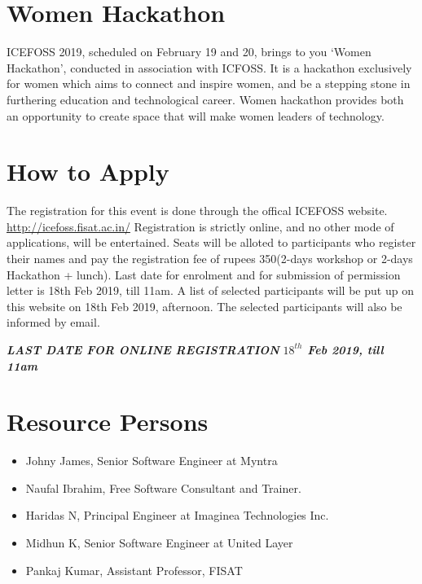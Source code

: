 \documentclass[notuble,10pt,a4paper]{leaflet}
\begin{document}
\newpage
\section{{\Large Women Hackathon}}
ICEFOSS 2019, scheduled on February 19 and 20, brings to you ‘Women Hackathon’, conducted in association with ICFOSS. It is a hackathon exclusively for women which aims to connect and inspire women, and be a stepping stone in furthering education and technological career. Women hackathon provides both an opportunity to create space that will make women leaders of technology.

\section{{\Large How to Apply}}
The registration for this event is done through the  offical ICEFOSS website.\newline\newline
\url{http://icefoss.fisat.ac.in/}\newline\newline
Registration is strictly online, and no other mode of applications, will be entertained. Seats will be alloted to participants who register their names and pay the registration fee of rupees 350(2-days workshop or 2-days Hackathon + lunch).
Last date for enrolment and for submission of permission letter is 18th Feb 2019, till 11am.
A list of selected participants will be put up on this website on 18th Feb 2019, afternoon. The selected participants will also be informed by email.

\emph{\textbf{LAST DATE FOR ONLINE REGISTRATION}}
\emph{\textbf{$18^{th}$ Feb 2019, till 11am}}

\section{\Large{Resource Persons}}

\begin{itemize}
\item Johny James, Senior Software Engineer at Myntra
\item Naufal Ibrahim, Free Software Consultant and Trainer.
\item Haridas N, Principal Engineer at Imaginea Technologies Inc.
\item Midhun K, Senior Software Engineer at United Layer
\item Pankaj Kumar, Assistant Professor, FISAT
\end{itemize}
 
\end{document}
